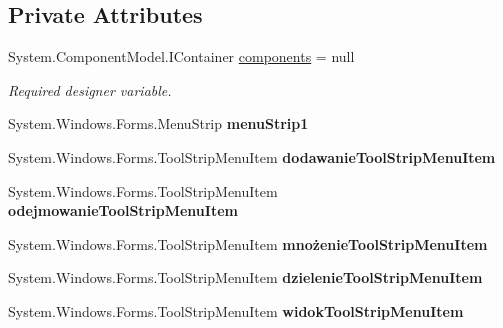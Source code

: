 \subsection*{Private Attributes}
\begin{DoxyCompactItemize}
\item 
System.\+Component\+Model.\+I\+Container \mbox{\hyperlink{class_quiz___matematyczny_1_1_cwiczenia_aaa628a9f3b4019b398ea588f67ecbc5b}{components}} = null
\begin{DoxyCompactList}\small\item\em Required designer variable. \end{DoxyCompactList}\item 
\mbox{\label{class_quiz___matematyczny_1_1_cwiczenia_a126263ba552e96bab06b8d2c9d6e0728}} 
System.\+Windows.\+Forms.\+Menu\+Strip {\bfseries menu\+Strip1}
\item 
\mbox{\label{class_quiz___matematyczny_1_1_cwiczenia_a0f890a047266fd3269761b688c82965f}} 
System.\+Windows.\+Forms.\+Tool\+Strip\+Menu\+Item {\bfseries dodawanie\+Tool\+Strip\+Menu\+Item}
\item 
\mbox{\label{class_quiz___matematyczny_1_1_cwiczenia_ae9dfe074bba8e127bceb91f6c391db59}} 
System.\+Windows.\+Forms.\+Tool\+Strip\+Menu\+Item {\bfseries odejmowanie\+Tool\+Strip\+Menu\+Item}
\item 
\mbox{\label{class_quiz___matematyczny_1_1_cwiczenia_a5114bc18b15447a35b0bfc046f9db743}} 
System.\+Windows.\+Forms.\+Tool\+Strip\+Menu\+Item {\bfseries mnożenie\+Tool\+Strip\+Menu\+Item}
\item 
\mbox{\label{class_quiz___matematyczny_1_1_cwiczenia_a6a515086bbc7bf516d0b676d69aa09f4}} 
System.\+Windows.\+Forms.\+Tool\+Strip\+Menu\+Item {\bfseries dzielenie\+Tool\+Strip\+Menu\+Item}
\item 
\mbox{\label{class_quiz___matematyczny_1_1_cwiczenia_a3e09eebdc0259e3d5b5f0b5d4fa36878}} 
System.\+Windows.\+Forms.\+Tool\+Strip\+Menu\+Item {\bfseries widok\+Tool\+Strip\+Menu\+Item}
\item 

\end{DoxyCompactItemize}
